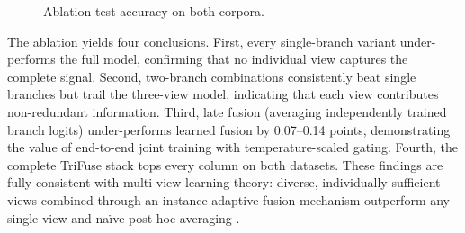 \documentclass[10pt,twocolumn,a4paper]{article}
\begin{document}
\begin{table}[!t]
\caption{Branch-level ablation results (\%).}
\label{tab:ablation_dual}
\centering
{}
\end{table}

\begin{figure}[!t]
\centering

\caption{Ablation test accuracy on both corpora.}
\label{fig:ablation}
\end{figure}

The ablation yields four conclusions. First, every single-branch variant under-performs the full model, confirming that no individual view captures the complete signal. Second, two-branch combinations consistently beat single branches but trail the three-view model, indicating that each view contributes non-redundant information. Third, late fusion (averaging independently trained branch logits) under-performs learned fusion by 0.07--0.14 points, demonstrating the value of end-to-end joint training with temperature-scaled gating. Fourth, the complete TriFuse stack tops every column on both datasets. These findings are fully consistent with multi-view learning theory: diverse, individually sufficient views combined through an instance-adaptive fusion mechanism outperform any single view and na\"ive post-hoc averaging \citep{ref19}.
\end{document}
